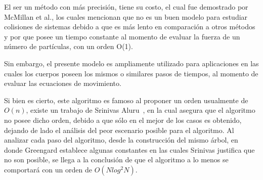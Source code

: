 El ser un método con más precisión, tiene su costo,
el cual fue demostrado por McMillan et al.\cite{mcmillan},
los cuales mencionan que no es un buen modelo para estudiar colisiones de sistemas
debido a que es más lento en comparación a otros métodos y
por que posee un tiempo constante al momento de evaluar la fuerza de un número
de partículas, con un orden O(1).

Sin embargo, el presente modelo es ampliamente utilizado para aplicaciones
en las cuales los cuerpos poseen los mismos o similares
pasos de tiempos, al momento de evaluar las ecuaciones de movimiento.

Si bien es cierto,
este algoritmo es famoso al proponer un orden usualmente de $O(n)$,
existe un trabajo de Srinivas Aluru~\cite{srinivas},
en la cual asegura que el algoritmo no posee dicho orden,
debido a que sólo en el mejor de los casos es obtenido,
dejando de lado el análisis del peor escenario posible para
el algoritmo. Al analizar cada paso del algoritmo,
desde la construcción del mismo árbol, en donde Greengard
establece algunas constantes en las cuales Srinivas
justifica que no son posible, se llega a la conclusión
de que el algoritmo a lo menos se comportará con un orden
de $O(N log^{2} N)$.
